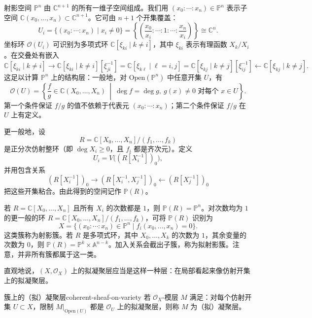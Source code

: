 \begin{example}[射影空间]
射影空间 $\mathbb P^n$ 由 $\mathbb C^{n+1}$ 的所有一维子空间组成。我们用 $(x_0:\cdots:x_n)\in\mathbb P^n$ 表示子空间 $\mathbb C(x_0,\ldots,x_n)\subset\mathbb C^{n+1}$。它可由 $n+1$ 个开集覆盖：
\[
  U_i=\{(x_0:\cdots:x_n)\mid x_i\ne0\}
  =\left\{\left(\frac{x_0}{x_i}:\cdots:1:\cdots:\frac{x_n}{x_i}\right)\right\}
  \cong\mathbb C^n.
\]
坐标环 $\mathcal O(U_i)$ 可识别为多项式环 $\mathbb C[\xi_{ki}\mid k\ne i]$，其中 $\xi_{ki}$ 表示有理函数 $X_k/X_i$。在交叠处有嵌入
\[
  \mathbb C[\xi_{ki}\mid k\ne i]
  \longrightarrow \mathbb C[\xi_{ki}\mid k\ne i][\xi_{ji}^{-1}]
  =\mathbb C[\xi_{k\ell}\mid \ell=i,j]
  =\mathbb C[\xi_{kj}\mid k\ne j][\xi_{ij}^{-1}]
  \longleftarrow\mathbb C[\xi_{kj}\mid k\ne j].
\]
这足以计算 $\mathbb P^n$ 上的结构层：一般地，对 $\mathrm{Open}(\mathbb P^n)$ 中任意开集 $U$，有
\[
  \mathcal O(U)=\left\{\frac fg\in\mathbb C(X_0,\ldots,X_n)
  \ \middle|\ \deg f=\deg g,\ g(x)\ne0\text{ 对每个 }x\in U\right\}.
\]
第一个条件保证 $f/g$ 的值不依赖于代表元 $(x_0:\cdots:x_n)$；第二个条件保证 $f/g$ 在 $U$ 上有定义。
\end{example}

\begin{example}[射影簇与拟射影簇]
更一般地，设
\[
  R=\mathbb C[X_0,\ldots,X_n]/(f_1,\ldots,f_k)
\]
是正分次仿射整环（即 $\deg X_i\ge0$，且 $f_i$ 都是齐次元）。定义
\[
  U_i=V\bigl((R[X_i^{-1}])_0\bigr),
\]
并用包含关系
\[
  (R[X_i^{-1}])_0\longrightarrow
  (R[X_i^{-1},X_j^{-1}])_0\longleftarrow(R[X_j^{-1}])_0
\]
把这些开集粘合。由此得到的空间记作 $\mathbb P(R)$。
\end{example}

若 $R=\mathbb C[X_0,\ldots,X_n]$ 且所有 $X_i$ 的次数都是 $1$，则 $\mathbb P(R)=\mathbb P^n$。对次数均为 $1$ 的更一般的环 $R=\mathbb C[X_0,\ldots,X_n]/(f_1,\ldots,f_k)$，可将 $\mathbb P(R)$ 识别为
\[
  X=\{(x_0:\cdots:x_n)\in\mathbb P^n\mid f_i(x_0,\ldots,x_n)=0\}.
\]
这类簇称为射影簇。若 $R$ 是多项式环，其中 $X_0,\ldots,X_k$ 的次数为 $1$，其余变量的次数为 $0$，则 $\mathbb P(R)=\mathbb P^k\times\mathbb A^{n-k}$。加入关系会截出子簇，称为拟射影簇。注意，并非所有簇都属于这一类。

直观地说，$(X,\mathcal O_X)$ 上的拟凝聚层应当是这样一种层：在局部看起来像仿射开集上的拟凝聚层。

\begin{definition}{簇上的（拟）凝聚层}{coherent-sheaf-on-variety}
若 $\mathcal O_X$-模层 $M$ 满足：对每个仿射开集 $U\subset X$，限制 $M|_{\mathrm{Open}(U)}$ 都是 $\mathcal O_U$ 上的拟凝聚层，则称 $M$ 为（拟）凝聚层。
\end{definition}


